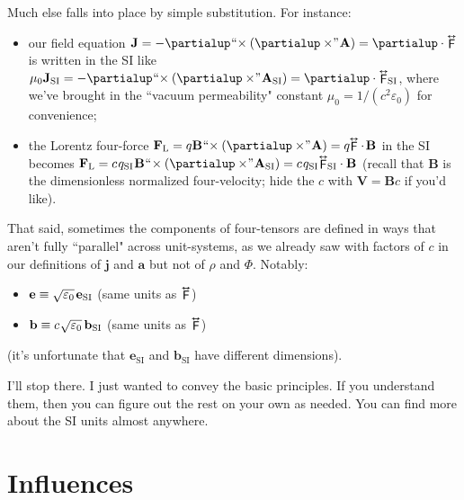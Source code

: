 \documentclass[12pt]{article}
\renewcommand{\vv}[1]{\mathbf{#1}}
\newcommand{\tightoverset}[2]{%
  \mathop{#2}\limits^{\vbox to -.5ex{\kern-0.75ex\hbox{$#1$}\vss}}}
\newcommand{\inlinedy}[1]{\tightoverset{\text{\tiny$\bm\leftrightarrow$}}{#1}}
\begin{document}
Much else falls into place by simple substitution. For instance:
\begin{itemize}
\item our field equation ${\vv J = - \partialup \mkern1mu `` \mkern-4mu \times ( \partialup \times \mkern-4mu " \mkern1mu \vv A)} = \partialup \cdot \inlinedy{\mathsf{F}}$ is written in the SI like ${\mu_0 \vv J_{\textrm{SI}} = - \partialup \mkern1mu `` \mkern-4mu \times ( \partialup \times \mkern-4mu " \mkern1mu \vv A_{\textrm{SI}}) = \partialup \cdot \inlinedy{\mathsf{F}}\mkern-4mu {}_{\textrm{SI}}}$, where we've brought in the ``vacuum permeability" constant $\mu_0 = 1 / (c^2 \varepsilon_0)$ for convenience;
\item the Lorentz four-force ${\vv F_{\textrm{L}} = q \vv B \mkern1mu `` \mkern-4mu \times (\partialup \times \mkern-4mu " \mkern1mu \vv A)} = q \mkern-4mu \inlinedy{\mathsf{F}} \cdot \mkern2mu \vv B$ in the SI becomes ${\vv F_{\textrm{L}} = c \mkern1.5mu q_{\textrm{SI}} \mkern1mu \vv B \mkern1mu `` \mkern-3mu \times (\partialup \times \mkern-4mu " \mkern1mu \vv A_{\textrm{SI}})} = c \mkern1.5mu q_{\textrm{SI}} \mkern-3mu \inlinedy{\mathsf{F}} \mkern-4mu {}_{\textrm{SI}} \cdot \vv B$ (recall that $\vv B$ is the dimensionless normalized four-velocity; hide the $c$ with $\vv V = \vv B c$ if you'd like).
\end{itemize}
That said, sometimes the components of four-tensors are defined in ways that aren't fully ``parallel" across unit-systems, as we already saw with factors of $c$ in our definitions of $\vv j$ and $\vv a$ but not of $\rho$ and $\Phi$. Notably:
\begin{itemize}
\item $\vv e \equiv \sqrt{\varepsilon_0} \mkern2mu \vv e_{\textrm{SI}}$ (same units as $\inlinedy{\mathsf{F}}$)
\item $\vv b \equiv c \mkern1mu \sqrt{\varepsilon_0} \mkern3mu \vv b_{\textrm{SI}}$ (same units as $\inlinedy{\mathsf{F}}$)
\end{itemize}
(it's unfortunate that $\vv e_{\textrm{SI}}$ and $\vv b_{\textrm{SI}}$ have different dimensions).

I'll stop there. I just wanted to convey the basic principles. If you understand them, then you can figure out the rest on your own as needed. You can find more about the SI units almost anywhere.

\clearpage

\section*{Influences}\label{sec:r}
\end{document}
